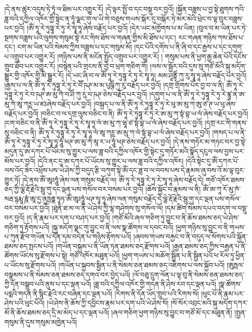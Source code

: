 །དེ་ནས་ཚུར་འདུས་ཏེ་ཏཱཾ་ལ་ཐིམ་པར་འགྱུར་རོ། །དེ་ལྟར་སྤྲོ་བ་དང་བསྡུ་བར་བྱའོ། །སྐྱོན་བཟླས་པ་བྱ་སྟེ་ཐུགས་ཀའི་ཟླ་བའི་དཀྱིལ་འཁོར་གྱི་སྟེང་ན་ཏཱཾ་ལྗང་གུ་ལ་ཡི་གེ་བཅུས་གཡས་སྐོར་དུ་བསྐོར་ཏེ་མར་མེའི་ཕྲེང་བ་ལྟ་བུར་བཟླས་པར་བྱའོ། །ཨོཾ་ཏཱ་རེ་ཏུཏྟཱ་རེ་ཏུ་རེ་སྭཱ་ཧཱ་ཞེས་བརྗོད་པར་བྱའོ། །དེར་ཡང་མགྱོགས་པ་མ་ཡིན། །བུལ་བ་མ་ཡིན་པར་ཏེ་སྔགས་བཟླས་པའི་ལུགས་གསུམ་སྟེ་རང་གིས་ཐོས་ལ་གཞན་གྱིས་མི་ཐོས་པ་དང་། རང་གཞན་གཉིས་ཀས་ཐོས་པ་དང་། ངག་མ་ཡིན་པའི་སེམས་ཀྱིས་བཟླས་པ་དང་གསུམ་མོ། །དང་པོའི་དགོས་པ་ནི་ཞི་བ་དང་རྒྱས་པ་དང་དགུག་པ་འགྲུབ་པར་འགྱུར་རོ། །གཉིས་པས་ནི་མངོན་སྤྱོད་འགྲུབ་པར་འགྱུར་རོ། །
གསུམ་པས་ནི་ཕྱག་རྒྱ་ཆེན་པོའི་དངོས་གྲུབ་ཐོབ་པར་འགྱུར་རོ། །བསྙེན་པའི་གྲངས་ནི་བྱེ་བ་ཕྲག་གཅིག་གོ། །ལས་ལ་སྦྱོར་བའི་དུས་སུ་གཙོ་མོའི་སྐུ་མདོག་སྒྱུར་གྱི་འཁོར་གྱི་མི་སྒྱུར་རོ། །དེ་ཡང་ཞི་བ་ལ་ཨོཾ་ཏཱ་རེ་ཏུཏྟཱ་རེ་ཏུ་རེ་སྭཱ་ཧཱ། མམ་ཤཱནྟིཾ་ཀུ་རུ་སྭཱ་ཧཱ་ཞེས་བརྗོད་པར་བྱའོ། །རྒྱས་པ་ལ་ནི་ཨོཾ་ཏཱ་རེ་ཏུཏྟཱ་རེ་ཏུ་རེ་བཽ་ཥཊ་མ་མ་པུཥྚིཾ་ཀུ་རུ་བརྗོད་པར་བྱའོ། །དགྲ་གྲོགས་པོར་བྱ་བ་ལ་ནི། ཨོཾ་ཏཱ་རེ་ཏུཏྟཱ་རེ་ཏུ་རེ་བ་ཥཊ་ཨ་མུ་ཀཾ་བ་ཤིཾ་ཀུ་རུ་བ་ཥཊ་ཅེས་བརྗོད་པར་བྱའོ། །དགུག་པ་ལ་ནི་ཨོཾ་ཏཱ་རེ་ཏུཏྟཱ་རེ་ཏུ་རེ་ཛྙཱ་ན་ཨ་མུ་ཀཾ་ཨཱ་ཀཪྵ་ཡ་ཛཿཞེས་བརྗོད་པར་བྱའོ། །བསྐྲད་པ་ལ་ནི་ཨོཾ་ཏཱ་རེ་ཏུཏྟཱ་རེ་ཏུ་རེ་ཕུ་ཨ་མུ་ཀ་ཨུ་ཙ་ཊ་ཡ་ཕུ་ཞེས་བརྗོད་པར་བྱའོ། །བཅིང་བ་ལ་དགྲ་ལུས་བཅིང་བ་ནི། ཨོཾ་ཏཱ་རེ་ཏུཏྟཱ་རེ་ཏུ་རེ་ཨ་མུ་ཀ་སྟཾ་བྷ་ཡ་ལཾ་ཞེས་བརྗོད་པར་བྱའོ། །ངག་བཅིང་བ་ནི་ཨོཾ་ཏཱ་རེ་ཏུཏྟཱ་རེ་ཏུ་རེ་སྭཱ་ཧཱ་ལཾ་ཨ་མུ་ཀ་ཝཱ་ཙ་སྟཾ་བྷ་ཡ་ལཾ་ཞེས་བརྗོད་པར་བྱའོ། །དགྲ་རང་གི་གནས་སུ་བཅིང་བ་ནི། ཨོཾ་ཏཱ་རེ་ཏུཏྟཱ་རེ་ཏུ་རེ་སྭཱ་ཧཱ་ལཾ་ཨཱ་ཀཪྵ་ཨ་མུ་ཀ་ལཾ་སྟཾ་བྷ་ཡ་ལཾ་ཞེས་བརྗོད་པར་བྱའོ། །གསད་པ་ལ་ནི་ཨོཾ་ཏཱ་རེ་ཏུཏྟཱ་རེ་ཏུ་རེ་སྭཱ་ཧཱ་ཧཱུཾ་ཕཊ་ཨ་མུ་ཀཾ་མཱ་ར་ཡ་ཧཱུཾ་ཕཊ་ཅེས་བརྗོད་པར་བྱའོ། །དེ་ནས་གཏོར་མ་གཏང་བར་བྱ་སྟེ་མདུན་དུ་ཨ་དཀར་པོ་ཡོངས་སུ་གྱུར་པ་ལས་ཟླ་བའི་དཀྱིལ་འཁོར་གྱི་སྟེང་དུ་གཏོར་མའི་སྣོད་དངུལ་ལས་བྱས་པར་མོས་པར་བྱའོ། །དེའི་ནང་དུ་ཨ་དཀར་པོ་ཡོངས་སུ་གྱུར་པ་ལས་ཟླ་བའི་དཀྱིལ་འཁོར། །དེའི་སྟེང་དུ་ཨོཾ་དཀར་པོ་ལས་འོད་ཟེར་འཕྲོས་པས་ཡེ་ཤེས་ཀྱི་བདུད་རྩི་བཀུག་སྟེ་ཨོཾ་དང་ཟླ་བ་ལ་བབས་པས་དེ་རྣམས་ཞུ་བས་འོ་མ་ལྟ་བུར་གྱུར་ཏོ། །དེ་ནས་ཨོཾ་ཨཱཿཧཱུཾ་ཞེས་ལན་གསུམ་བརྗོད་ལ། ཨོཾ་ཏཱ་རེ་ཏུཏྟཱ་རེ་ཏུ་རེ་སྭཱ་ཧཱ་ཞེས་བརྗོད་དེ། གཙོ་འཁོར་ཐམས་ཅད་ཀྱི་ལྕེ་རྡོ་རྗེའི་སྦུ་གུ་དང་ལྡན་པས་གསོལ་བར་བསམ་པར་བྱའོ། །ཆོས་སྐྱོང་བ་རྣམས་ལ་ནི། ཨོཾ་ཨ་ཀཱ་རོ་མུ་ཁཾ་སརྦ་དྷརྨཱ་ཎཱཾ་ཨཱ་དྱ་ནུཏྤནྣ་ཏྭཱཏ་ཨོཾ་ཨཱཿཧཱུཾ་ཕཊ་སྭཱ་ཧཱ་ཞེས་ལན་གསུམ་བརྗོད་དེ་ལྕེ་རྡོ་རྗེའི་སྦུ་གུ་དང་ལྡན་པས་གསོལ་བར་བསམ་པར་བྱའོ། །ཐུན་ཐ་མ་ལ་ནི་ཡེ་ཤེས་ཀྱི་ལྷ་གཤེགས་སུ་གསོལ་ལོ། །དམ་ཚིག་སེམས་དཔའ་བདག་ལ་བསྡུ་བར་བྱའོ། །ད་ནི་རྣམ་པར་དག་པ་བཤད་པར་བྱའོ། །གཙོ་མོའི་ཞལ་གཅིག་ཏུ་བྱུང་བ་ནི་ཆོས་ཐམས་ཅད་ཡེ་ཤེས་གཅིག་ཏུ་རྟོགས་པའོ། །སྐུ་མདོག་ལྗང་གུ་བྱུང་བ་ནི་ལས་སྣ་ཚོགས་ལ་དབང་བའོ། །ཕྱག་གཉིས་སུ་བྱུང་བ་ནི་གཡས་པ་ཀུན་རྫོབ་གཡོན་པ་དོན་དམ་བདེན་པ་གཉིས་རྟོགས་པའོ། །ཞབས་གཡས་བརྐྱང་བ་ནི་བདུད་ལ་སོགས་པའི་སྐྱོན་ཐམས་ཅད་སྤངས་པའོ། །གཡོན་བསྐུམ་པ་ནི་ཡོན་ཏན་ཐམས་ཅད་རྫོགས་པའོ། །རྒྱན་ཐམས་ཅད་ཀྱིས་བརྒྱན་པ་ནི་ཚོགས་ཡོངས་སུ་རྫོགས་པ་སྟེ། གཙོ་འཁོར་མཐུན་པའོ། །ཕྱག་གཡས་པ་མཆོག་སྦྱིན་པ་ནི་སྦྱིན་པའི་ཕ་རོལ་ཏུ་ཕྱིན་པ་ཡོངས་སུ་རྫོགས་པའོ། །གཡོན་པ་སྐྱབས་སྦྱིན་པ་ནི་སེམས་ཅན་ཐམས་ཅད་འཇིགས་པ་ལས་སྐྱོབ་པའོ། །ཨུཏྤལ་བསྣམས་པ་ནི་སེམས་ཅན་ཐམས་ཅད་དགའ་བར་བྱེད་པའོ། །ལོ་བཅུ་དྲུག་ལོན་པ་ལྟ་བུ་ནི་སེམས་ཅན་ཐམས་ཅད་ཀྱི་དོན་བསྒྲུབ་པའི་ནུས་པ་དང་ལྡན་པའོ། །ཟླ་བའི་དཀྱིལ་འཁོར་གྱི་གདན་ནི་ཤེས་རབ་དང་ལྡན་པའོ། །སྣ་ཚོགས་པདྨའི་གདན་ནི་སྙིང་རྗེའི་རང་བཞིན་དང་ལྡན་པའོ། །རིགས་ནི་དོན་ཡོད་གྲུབ་པའི་རིགས་སོ། །ཕུང་པོ་ནི་རྣམ་པར་ཤེས་པའི་ཕུང་པོའོ། །ཡེ་ཤེས་ནི་ཆོས་ཀྱི་དབྱིངས་རྣམ་པར་དག་པའི་ཡེ་ཤེས་སོ། །སོ་སོར་འབྲང་མའི་སྐུ་མདོག་དཀར་མོ་ནི་ཆོས་ཐམས་ཅད་དྲི་མ་མེད་པ་དང་ལྡན་པའོ། །ཞལ་གཅིག་ཕྱག་གཉིས་སུ་བྱུང་བ་གཙོ་མོ་དང་མཐུན་ནོ། །སྤྱན་གསུམ་ནི་དུས་གསུམ་མཁྱེན་པའོ། 